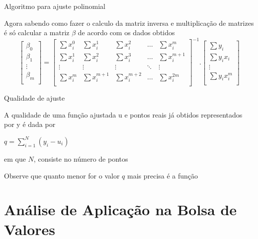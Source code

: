 \documentclass[10pt]{beamer}
\begin{document}
\begin{frame}{Algoritmo para ajuste polinomial}

  Agora sabendo como fazer o calculo da matriz inversa e multiplicação de matrizes é só calcular a matriz $\beta$ de acordo com os dados obtidos
  \[
    \begin{bmatrix}
      \beta_0 \\
      \beta_1 \\
      \vdots  \\
      \beta_m \\
    \end{bmatrix}
    =
    \begin{bmatrix}
      \sum{x_{i}^{0}} & \sum{x_{i}^{1}} & \sum{x_{i}^{2}} & \dots  & \sum{x_{i}^{m}} \\
      \sum{x_{i}^{1}} & \sum{x_{i}^{2}} & \sum{x_{i}^{3}} & \dots & \sum{x_{i}^{m+1}}\\
      \vdots & \vdots & \vdots & \ddots & \vdots \\
      \sum{x_{i}^{m}} & \sum{x_{i}^{m+1}} & \sum{x_{i}^{m+2}} & \dots  & \sum{x_{i}^{2m}} \\
    \end{bmatrix}^{-1}
    .
    \begin{bmatrix}
      \sum{y_{i}} \\
      \sum{y_{i}x_{i}}\\
      \vdots \\
      \sum{y_{i}x_{i}^{m}} \\
    \end{bmatrix}
  \]
\end{frame}

\begin{frame}{Qualidade de ajuste}

    A qualidade de uma função ajustada u e pontos reais já obtidos representados por y é dada por
    \begin{center}
        $q = \sum_{i=1}^{N} (y_{i}-u_{i})$
    \end{center}
    em que $N$, consiste no número de pontos
    
    Observe que quanto menor for o valor $q$ mais precisa é a função
\end{frame}

\section{Análise de Aplicação na Bolsa de Valores}
\end{document}
